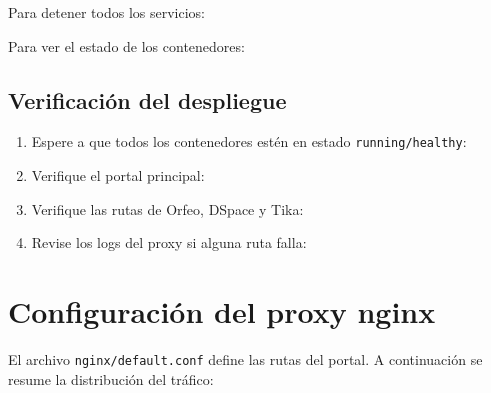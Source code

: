 \documentclass[12pt,a4paper]{report}
\begin{document}
Para detener todos los servicios:


Para ver el estado de los contenedores:


\section{Verificación del despliegue}

\begin{enumerate}
  \item Espere a que todos los contenedores estén en estado
        \texttt{running/healthy}: 
  \item Verifique el portal principal:
  \item Verifique las rutas de Orfeo, DSpace y Tika:
  \item Revise los logs del proxy si alguna ruta falla:
\end{enumerate}

\chapter{Configuración del proxy nginx}

El archivo \texttt{nginx/default.conf} define las rutas del portal. A
continuación se resume la distribución del tráfico:
\end{document}
